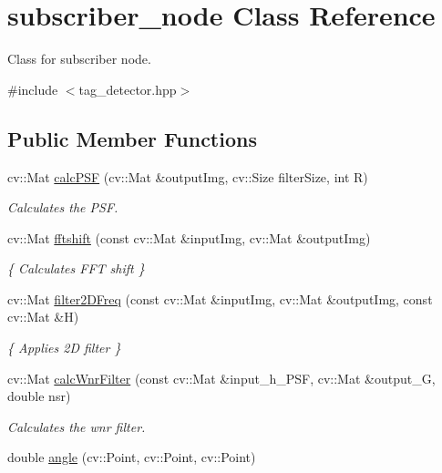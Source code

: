 \hypertarget{classsubscriber__node}{}\section{subscriber\+\_\+node Class Reference}
\label{classsubscriber__node}


Class for subscriber node.  




{\ttfamily \#include $<$tag\+\_\+detector.\+hpp$>$}

\subsection*{Public Member Functions}
\begin{DoxyCompactItemize}
\item 
cv\+::\+Mat \hyperlink{classsubscriber__node_a59aeb819e9540645b4cc14b4c3c91c6c}{calc\+P\+SF} (cv\+::\+Mat \&output\+Img, cv\+::\+Size filter\+Size, int R)
\begin{DoxyCompactList}\small\item\em Calculates the P\+SF. \end{DoxyCompactList}\item 
cv\+::\+Mat \hyperlink{classsubscriber__node_a2ef8da4f3e87be4fec6dc52e0f359cd4}{fftshift} (const cv\+::\+Mat \&input\+Img, cv\+::\+Mat \&output\+Img)
\begin{DoxyCompactList}\small\item\em \{ Calculates F\+FT shift \} \end{DoxyCompactList}\item 
cv\+::\+Mat \hyperlink{classsubscriber__node_a36eaa05a731a6cd5168c41f7cd2acb80}{filter2\+D\+Freq} (const cv\+::\+Mat \&input\+Img, cv\+::\+Mat \&output\+Img, const cv\+::\+Mat \&H)
\begin{DoxyCompactList}\small\item\em \{ Applies 2D filter \} \end{DoxyCompactList}\item 
cv\+::\+Mat \hyperlink{classsubscriber__node_a52f5fe8fbe6a886fa5b6f0b36c62367e}{calc\+Wnr\+Filter} (const cv\+::\+Mat \&input\+\_\+h\+\_\+\+P\+SF, cv\+::\+Mat \&output\+\_\+G, double nsr)
\begin{DoxyCompactList}\small\item\em Calculates the wnr filter. \end{DoxyCompactList}\item 
double \hyperlink{classsubscriber__node_acdf1620562e8b05d155e3a58e41c28d6}{angle} (cv\+::\+Point, cv\+::\+Point, cv\+::\+Point)

\end{DoxyCompactItemize}
